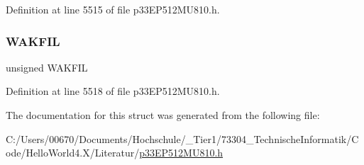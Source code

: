 Definition at line 5515 of file p33\+E\+P512\+M\+U810.\+h.

\mbox{\label{structtag_c2_c_f_g2_b_i_t_s_ab2a0670f9689af2dafc7a8239d64d820}} 
\subsubsection{\texorpdfstring{W\+A\+K\+F\+IL}{WAKFIL}}
{\footnotesize\ttfamily unsigned W\+A\+K\+F\+IL}



Definition at line 5518 of file p33\+E\+P512\+M\+U810.\+h.



The documentation for this struct was generated from the following file\+:\begin{DoxyCompactItemize}
\item 
C\+:/\+Users/00670/\+Documents/\+Hochschule/\+\_\+\+Tier1/73304\+\_\+\+Technische\+Informatik/\+Code/\+Hello\+World4.\+X/\+Literatur/\hyperlink{p33_e_p512_m_u810_8h}{p33\+E\+P512\+M\+U810.\+h}\end{DoxyCompactItemize}
